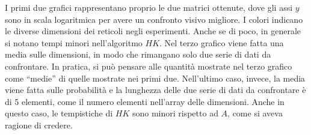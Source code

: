 I primi due grafici rappresentano proprio le due matrici ottenute, dove gli assi $y$ sono in scala 
logaritmica per avere un confronto visivo migliore. I colori indicano le diverse dimensioni dei reticoli 
negli esperimenti. Anche se di poco, in generale si notano tempi minori nell'algoritmo $HK$.
Nel terzo grafico viene fatta una media sulle dimensioni, in modo che rimangano solo due serie di dati da confrontare.
In pratica, si può pensare alle quantità mostrate nel terzo grafico come ``medie'' di quelle mostrate nei primi due.
Nell'ultimo caso, invece, la media viene fatta sulle probabilità e la lunghezza delle due serie di dati da confrontare è 
di 5 elementi, come il numero elementi nell'array delle dimensioni. 
Anche in questo caso, le tempistiche di $HK$ sono minori rispetto ad $A$, come 
si aveva ragione di credere.